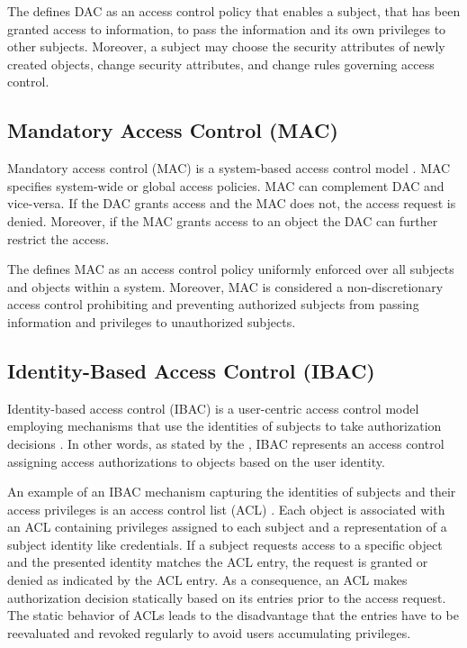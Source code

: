 The \citeauthor{JTF2020} \cite{JTF2020} defines DAC as an access control policy that enables a subject, that has been granted access to information, to pass the information and its own privileges to other subjects.
Moreover, a subject may choose the security attributes of newly created objects, change security attributes, and change rules governing access control.

\subsection{Mandatory Access Control (MAC)}
Mandatory access control (MAC) is a system-based access control model \cite{Eckert2023}.
MAC specifies system-wide or global access policies.
MAC can complement DAC and vice-versa.
If the DAC grants access and the MAC does not, the access request is denied.
Moreover, if the MAC grants access to an object the DAC can further restrict the access.

The \citeauthor{JTF2020} \cite{JTF2020} defines MAC as an access control policy uniformly enforced over all subjects and objects within a system.
Moreover, MAC is considered a non-discretionary access control prohibiting and preventing authorized subjects from passing information and privileges to unauthorized subjects.

\subsection{Identity-Based Access Control (IBAC)}
Identity-based access control (IBAC) is a user-centric access control model employing mechanisms that use the identities of subjects to take authorization decisions \cite{Hu2014}.
In other words, as stated by the \citeauthor{CNSS2022} \cite{CNSS2022}, IBAC represents an access control assigning access authorizations to objects based on the user identity.

An example of an IBAC mechanism capturing the identities of subjects and their access privileges is an access control list (ACL) \cite{Hu2014}.
Each object is associated with an ACL containing privileges assigned to each subject and a representation of a subject identity like credentials.
If a subject requests access to a specific object and the presented identity matches the ACL entry, the request is granted or denied as indicated by the ACL entry.
As a consequence, an ACL makes authorization decision statically based on its entries prior to the access request.
The static behavior of ACLs leads to the disadvantage that the entries have to be reevaluated and revoked regularly to avoid users accumulating privileges.

